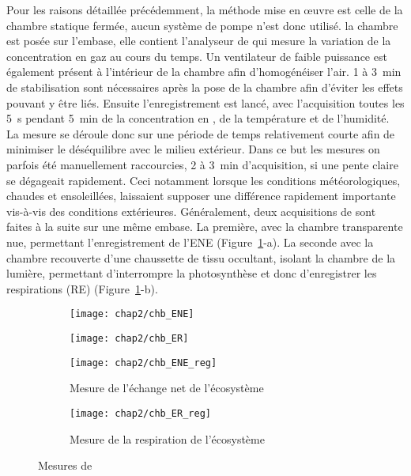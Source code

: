 Pour les raisons détaillée précédemment, la méthode mise en œuvre est celle de la chambre statique fermée, aucun système de pompe n'est donc utilisé.
la chambre est posée sur l'embase, elle contient l'analyseur de \coo qui mesure la variation de la concentration en gaz au cours du temps.
Un ventilateur de faible puissance est également présent à l'intérieur de la chambre afin d'homogénéiser l'air.
1 à \SI{3}{\minute} de stabilisation sont nécessaires après la pose de la chambre afin d'éviter les effets pouvant y être liés.
Ensuite l’enregistrement est lancé, avec l'acquisition toutes les \SI{5}{\second} pendant \SI{5}{\minute} de la concentration en \coo, de la température et de l'humidité.
La mesure se déroule donc sur une période de temps relativement courte afin de minimiser le déséquilibre avec le milieu extérieur.
Dans ce but les mesures on parfois été manuellement raccourcies, 2 à \SI{3}{\minute} d'acquisition, si une pente claire se dégageait rapidement.
Ceci notamment lorsque les conditions météorologiques, chaudes et ensoleillées, laissaient supposer une différence rapidement importante vis-à-vis des conditions extérieures.
Généralement, deux acquisitions de \coo sont faites à la suite sur une même embase.
La première, avec la chambre transparente nue, permettant l'enregistrement de l'ENE (Figure~\ref{fig:chb}-a).
La seconde avec la chambre recouverte d'une chaussette de tissu occultant, isolant la chambre de la lumière, permettant d'interrompre la photosynthèse et donc d'enregistrer les respirations (RE) (Figure~\ref{fig:chb}-b).

\begin{figure}
	\centering
	\begin{subfigure}[t]{0.5\textwidth}
		\centering
		\texttt{[image: chap2/chb\_ENE]}
	\end{subfigure}%
	\begin{subfigure}[t]{0.5\textwidth}
		\centering
		\texttt{[image: chap2/chb\_ER]}
	\end{subfigure}%

	\begin{subfigure}[t]{0.5\textwidth}
		\texttt{[image: chap2/chb\_ENE\_reg]}
		\caption{Mesure de l'échange net de l'écosystème}
	\end{subfigure}%
	\begin{subfigure}[t]{0.5\textwidth}
		\texttt{[image: chap2/chb\_ER\_reg]}
		\caption{Mesure de la respiration de l'écosystème}
	\end{subfigure}
\caption{Mesures de \coo}
\label{fig:chb}
\end{figure}


